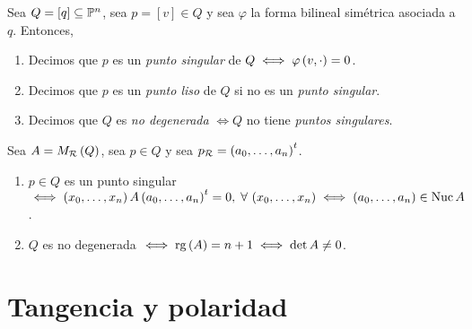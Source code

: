 \begin{defi} 
  Sea $Q=\left[ q \right] \subseteq \mathbb{P} ^n$, sea $p = \left[ v \right] \in Q$ y sea $\varphi$ la forma bilineal simétrica asociada a $q$. Entonces, 
  \begin{enumerate}[(1)] 
    \item Decimos que $p$ es un \textit{punto singular} de $Q \iff \varphi \left( v, \cdot \right) = 0$.
    \item Decimos que $p$ es un \textit{punto liso} de $Q$ si no es un \textit{punto singular}.
    \item Decimos que $Q$ es \textit{no degenerada} $\iff Q$ no tiene \textit{puntos singulares}. 
  \end{enumerate}
\end{defi}

\begin{obs}
  Sea $A=M_{\mathcal{R}} \left( Q \right)$, sea $p \in Q$ y sea $p_{\mathcal{R}} = \left( a_0, \dots , a_n \right) ^t$.
  \begin{enumerate}[(1)]
    \item $p\in Q$ es un punto singular $\iff \left( x_0, \dots , x_n \right) A \left( a_0, \dots , a_n \right) ^t = 0, \; \forall \, \left( x_0, \dots , x_n \right) \iff \left( a_0, \dots , a_n \right) \in \operatorname{Nuc} A$.
    \item $Q$ es no degenerada $\iff \operatorname{rg} \left( A \right) = n+1 \iff \det A \neq 0$.
  \end{enumerate}
\end{obs}



\section{Tangencia y polaridad}

